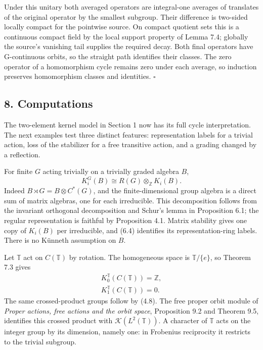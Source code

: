 \documentclass[
  11pt,
]{article}
\begin{document}
Under this unitary both averaged operators are integral-one averages of
translates of the original operator by the smallest subgroup. Their
difference is two-sided locally compact for the pointwise source. On
compact quotient sets this is a continuous compact field by the local
support property of Lemma 7.4; globally the source's vanishing tail
supplies the required decay. Both final operators have G-continuous
orbits, so the straight path identifies their classes. The zero operator
of a homomorphism cycle remains zero under each average, so induction
preserves homomorphism classes and identities. \(\square\)

\subsection{8. Computations}\label{computations}

The two-element kernel model in Section 1 now has its full cycle
interpretation. The next examples test three distinct features:
representation labels for a trivial action, loss of the stabilizer for a
free transitive action, and a grading changed by a reflection.

For finite \(G\) acting trivially on a trivially graded algebra \(B\),
\[
K_i^G(B)\cong R(G)\otimes_{\mathbb Z}K_i(B).
\tag{8.1}
\] Indeed \(B\rtimes G=B\otimes C^*(G)\), and the finite-dimensional
group algebra is a direct sum of matrix algebras, one for each
irreducible. This decomposition follows from the invariant orthogonal
decomposition and Schur's lemma in Proposition 6.1; the regular
representation is faithful by Proposition 4.1. Matrix stability gives
one copy of \(K_i(B)\) per irreducible, and (6.4) identifies its
representation-ring labels. There is no Künneth assumption on \(B\).

Let \(\mathbb T\) act on \(C(\mathbb T)\) by rotation. The homogeneous
space is \(\mathbb T/\{e\}\), so Theorem 7.3 gives \[
\begin{gathered}
K_0^{\mathbb T}(C(\mathbb T))=\mathbb Z,\\
K_1^{\mathbb T}(C(\mathbb T))=0.
\end{gathered}
\tag{8.2}
\] The same crossed-product groups follow by (4.8). The free proper
orbit module of \emph{Proper actions, free actions and the orbit space},
Proposition 9.2 and Theorem 9.5, identifies this crossed product with
\(\mathcal K(L^2(\mathbb T))\). A character of \(\mathbb T\) acts on the
integer group by its dimension, namely one: in Frobenius reciprocity it
restricts to the trivial subgroup.
\end{document}
